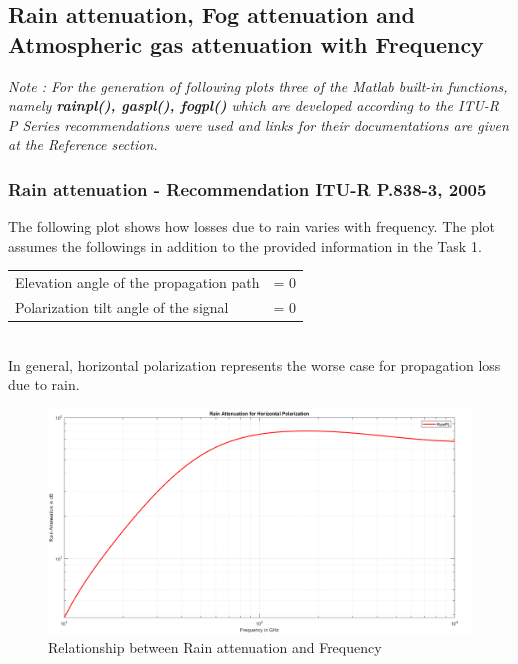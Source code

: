 \documentclass[a4paper,11pt]{article}%
\begin{document}
\pagebreak
\subsection{Rain attenuation, Fog attenuation and Atmospheric gas attenuation with Frequency}

\textit{Note : For the generation of following plots three of the Matlab built-in functions, namely \textbf{rainpl(), gaspl(), fogpl()} which are developed according to the ITU-R P Series recommendations were used and links for their documentations are given at the Reference section.}


\subsubsection{Rain attenuation - Recommendation ITU-R P.838-3, 2005}
The following plot shows how losses due to rain varies with frequency. The plot assumes the followings in addition to the provided information in the Task 1.\\

\begin{tabular}{l l}
Elevation angle of the propagation path& = 0 \\
Polarization tilt angle of the signal &= 0\\
\end{tabular}\\

In general, horizontal polarization represents the worse case for propagation loss due to rain.

\begin{figure}[!h]
	\centering
	\includegraphics[scale=0.35]{figures/rpl}
	\caption{Relationship between Rain attenuation and Frequency}
\end{figure}
\end{document}
